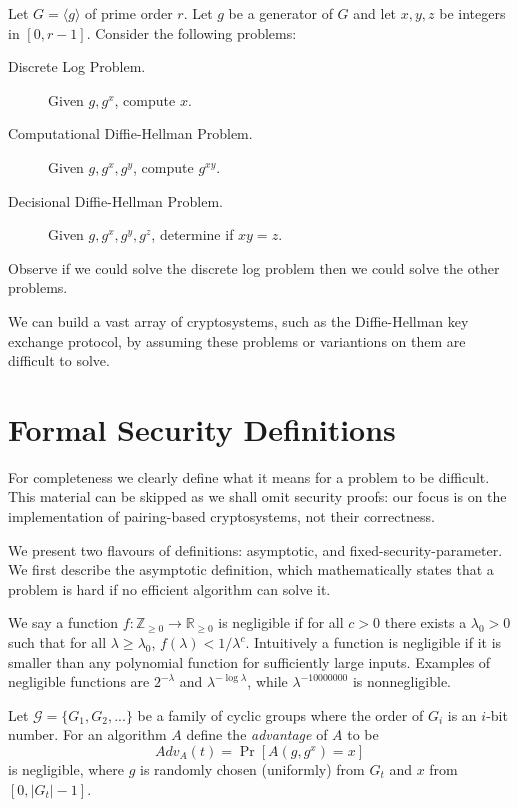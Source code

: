 Let $G = \langle g \rangle$ of prime order $r$. Let $g$ be a generator of $G$
and let $x, y, z$ be integers in $[0, r-1]$. Consider the following problems:

\begin{description}
\item [Discrete Log Problem.]
Given $g, g^x$, compute $x$.
\item [Computational Diffie-Hellman Problem.]
Given $g, g^x, g^y$, compute $g^{x y}$.
\item [Decisional Diffie-Hellman Problem.]
Given $g, g^x, g^y, g^z$, determine if $x y = z$.
\end{description}

Observe if we could solve the discrete log problem then we could solve
the other problems.

We can build a vast array of cryptosystems, such as the Diffie-Hellman key
exchange protocol, by assuming these problems or variantions on them are
difficult to solve.

\section{Formal Security Definitions}

For completeness we clearly define what it means for a problem to be
difficult. This material can be skipped as we shall omit security proofs: our
focus is on the implementation of pairing-based cryptosystems, not their
correctness.

We present two flavours of definitions: asymptotic, and
fixed-security-parameter. We first describe the asymptotic definition,
which mathematically states that a problem is hard if no efficient algorithm
can solve it.

We say a function $f:\mathbb{Z}_{\ge 0} \rightarrow \mathbb{R}_{\ge 0}$
is negligible if for all $c > 0$ there exists a $\lambda_0 > 0$ such that
for all $\lambda \ge \lambda_0$, $f(\lambda) < 1 / \lambda^c$.
Intuitively a function is negligible if it is smaller than any polynomial
function for sufficiently large inputs. Examples of negligible functions
are $2^{-\lambda}$ and $\lambda^{-\log\lambda}$, while $\lambda^{-10000000}$
is nonnegligible.

Let $\mathcal G = \{G_1, G_2, ... \}$ be a family of cyclic groups
where the order of $G_i$ is an $i$-bit number.
For an algorithm $A$
define the \emph{advantage} of $A$ to be
\[
Adv_A(t) = \Pr [ A(g, g^x) = x ]
\]
is negligible,
where $g$ is randomly chosen (uniformly) from $G_t$ and $x$ from
$[0, |G_t|-1]$.

